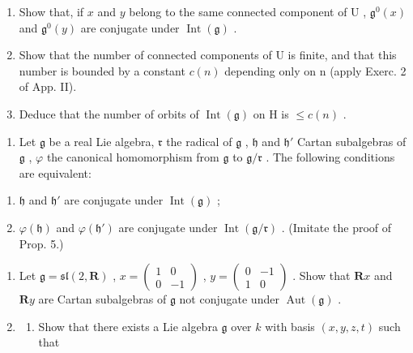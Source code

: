 \begin{enumerate}
\def\labelenumi{\alph{enumi})}
\item
  Show that, if \(x\) and \(y\) belong to the same connected component of \(\mathrm{U}\) , \(\mathfrak{g}^0(x)\) and \(\mathfrak{g}^0(y)\) are conjugate under \(\operatorname{Int}(\mathfrak{g})\) .
\item
  Show that the number of connected components of U is finite, and that this number is bounded by a constant \(c(n)\) depending only on n (apply Exerc. 2 of App. II).
\item
  Deduce that the number of orbits of \(\operatorname{Int}(\mathfrak{g})\) on \(\mathrm{H}\) is \(\leq c(n)\) .
\end{enumerate}

\begin{enumerate}
\def\labelenumi{\arabic{enumi})}
\setcounter{enumi}{2}
\tightlist
\item
  Let \(\mathfrak{g}\) be a real Lie algebra, \(\mathfrak{r}\) the radical of \(\mathfrak{g}\) , \(\mathfrak{h}\) and \(\mathfrak{h}'\) Cartan subalgebras of \(\mathfrak{g}\) , \(\varphi\) the canonical homomorphism from \(\mathfrak{g}\) to \(\mathfrak{g} / \mathfrak{r}\) . The following conditions are equivalent:
\end{enumerate}

\begin{enumerate}
\def\labelenumi{(\roman{enumi})}
\item
  \(\mathfrak{h}\) and \(\mathfrak{h}'\) are conjugate under \(\operatorname{Int}(\mathfrak{g})\) ;
\item
  \(\varphi(\mathfrak{h})\) and \(\varphi(\mathfrak{h}')\) are conjugate under \(\operatorname{Int}(\mathfrak{g}/\mathfrak{r})\) . (Imitate the proof of Prop. 5.)
\end{enumerate}

\begin{enumerate}
\def\labelenumi{\arabic{enumi})}
\setcounter{enumi}{3}
\item
  Let \(\mathfrak{g} = \mathfrak{sl}(2, \mathbf{R})\) , \(x = \begin{pmatrix} 1 & 0 \\ 0 & -1 \end{pmatrix}\) , \(y = \begin{pmatrix} 0 & -1 \\ 1 & 0 \end{pmatrix}\) . Show that \(\mathbf{R}x\) and \(\mathbf{R}y\) are Cartan subalgebras of \(\mathfrak{g}\) not conjugate under \(\operatorname{Aut}(\mathfrak{g})\) .
\item
  \begin{enumerate}
  \def\labelenumii{\alph{enumii})}
  \tightlist
  \item
    Show that there exists a Lie algebra \(\mathfrak{g}\) over \(k\) with basis \((x,y,z,t)\) such that
  \end{enumerate}
\end{enumerate}


